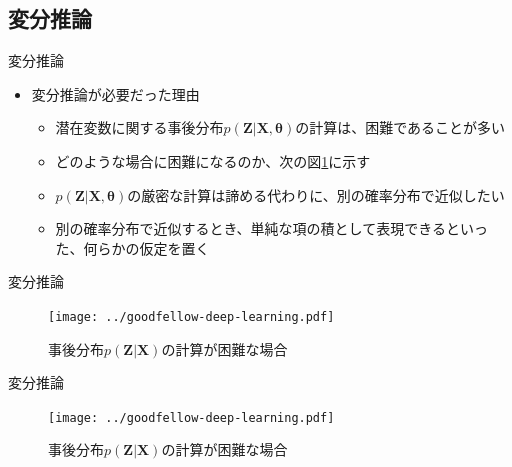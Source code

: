 \documentclass[dvipdfmx,notheorems,t]{beamer}
\begin{document}
\subsection{変分推論}

\begin{frame}{変分推論}

\begin{itemize}
	\item 変分推論が必要だった理由
	\begin{itemize}
		\item 潜在変数に関する事後分布$p(\bm{Z} | \bm{X}, \bm{\theta})$の計算は、困難であることが多い
		\item どのような場合に困難になるのか、次の図\ref{fig:example-of-inference-problems}に示す
		\newline
		\item $p(\bm{Z} | \bm{X}, \bm{\theta})$の厳密な計算は諦める代わりに、\alert{別の確率分布で近似}したい
		\newline
		\item 別の確率分布で近似するとき、単純な項の積として表現できるといった、\alert{何らかの仮定を置く}
	\end{itemize}
\end{itemize}

\end{frame}

\begin{frame}{変分推論}

\begin{figure}[h]
	\centering
	\texttt{[image: ../goodfellow-deep-learning.pdf]}
	\caption{事後分布$p(\bm{Z} | \bm{X})$の計算が困難な場合}
	\label{fig:example-of-inference-problems}
\end{figure}

\end{frame}

\begin{frame}{変分推論}

\begin{figure}[h]
	\centering
	\texttt{[image: ../goodfellow-deep-learning.pdf]}
	\caption{事後分布$p(\bm{Z} | \bm{X})$の計算が困難な場合}
	\label{fig:example-of-inference-problems-2}
\end{figure}

\end{frame}
\end{document}
